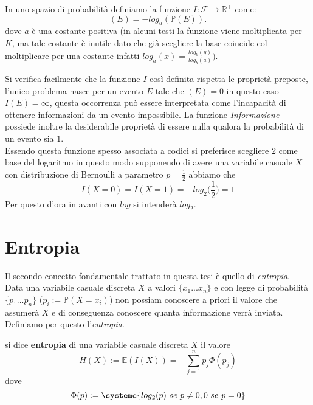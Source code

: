 \begin{defi}
In uno spazio di probabilità \spacep definiamo la funzione $I: \mathcal{F}\to \mathbb{R}^+$ come:
\begin{equation}
(E)=-log_a(\mathbb{P} (E)).
\end{equation}
dove $a$ è una costante positiva (in alcuni testi la funzione viene moltiplicata per $K$,  ma tale costante è inutile dato che già scegliere la base coincide col moltiplicare per una costante infatti $log_a(x)=\frac{log_b(y)}{log_b(a)} \bigg)$.
\end{defi}

Si verifica facilmente che la funzione $I$ così definita rispetta le proprietà preposte, l'unico problema nasce per un evento $E$ tale che \p $(E)=0$ in questo caso $I(E)=\infty$, questa occorrenza può essere interpretata come l'incapacità di ottenere informazioni da un evento impossibile. La funzione \textit{Informazione} possiede inoltre la desiderabile proprietà di essere nulla qualora la probabilità di un evento sia $1$.\\
Essendo questa funzione spesso associata a codici si preferisce scegliere $2$ come base del logaritmo in questo modo supponendo di avere una variabile casuale $X$ con distribuzione di Bernoulli a parametro $p=\frac{1}{2}$ abbiamo che 
\begin{equation}
I(X=0)=I(X=1)=-log_2 \bigg(\frac{1}{2} \bigg ) =1
\end{equation}
Per questo d'ora in avanti con $log$ si intenderà $log_2$.

\section{Entropia}
\label{sec:Entropia}

Il secondo concetto fondamentale trattato in questa tesi è quello di \textit{entropia}.\\
Data una variabile casuale discreta $X$ a valori $\{ x_1...x_n \}$ e con legge di probabilità $\{p_1...p_n \}$ ($p_i:=\mathbb{P}(X=x_i)$) non possiam conoscere a priori il valore che assumerà $X$ e di conseguenza conoscere quanta informazione verrà inviata. Definiamo per questo l'\textit{entropia}.

\begin{defi}
si dice \textbf{entropia} di una variabile casuale discreta $X$ il valore
\begin{equation}
H(X):=\mathbb{E}(I(X))=-\sum_{j=1}^np_j\Phi(p_j)
\end{equation}
dove
$$\Phi(p):=
\systeme{
log_2(p)\ se \ p \neq 0 ,
0 \ se \  p=0}
$$
\end{defi}

